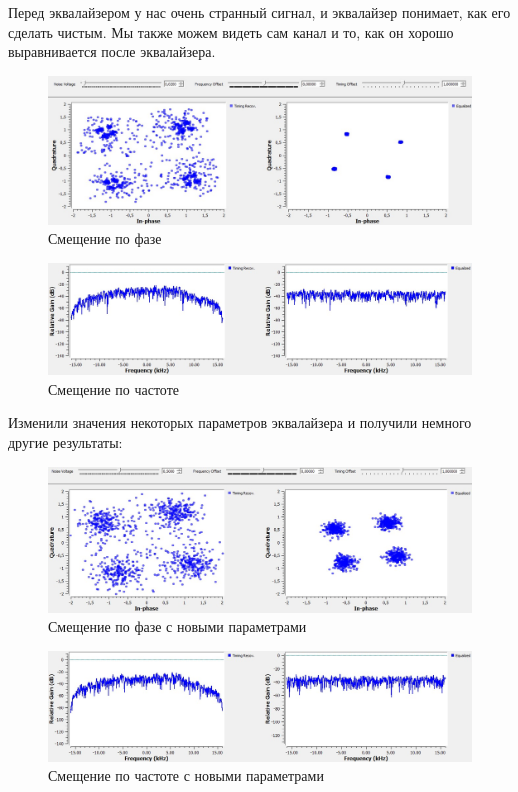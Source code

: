 \documentclass[a4paper, 12pt]{report}
\begin{document}
	Перед эквалайзером у нас очень странный сигнал, и эквалайзер понимает, как его сделать чистым. Мы также можем видеть сам канал и то, как он хорошо выравнивается после эквалайзера.
	\begin{figure}[H]
		\centering
		\includegraphics[width=1.0\textwidth]{28.jpg}
		\caption{Смещение по фазе}
		\label{fig:28}
	\end{figure}
	\begin{figure}[H]
		\centering
		\includegraphics[width=1.0\textwidth]{29.jpg}
		\caption{Смещение по частоте}
		\label{fig:29}
	\end{figure}
	Изменили значения некоторых параметров эквалайзера и получили немного другие результаты:
	\begin{figure}[H]
		\centering
		\includegraphics[width=1.0\textwidth]{30.jpg}
		\caption{Смещение по фазе с новыми параметрами}
		\label{fig:31}
	\end{figure}
	\begin{figure}[H]
		\centering
		\includegraphics[width=1.0\textwidth]{31.jpg}
		\caption{Смещение по частоте с новыми параметрами}
		\label{fig:31}
	\end{figure}
	
\end{document}
